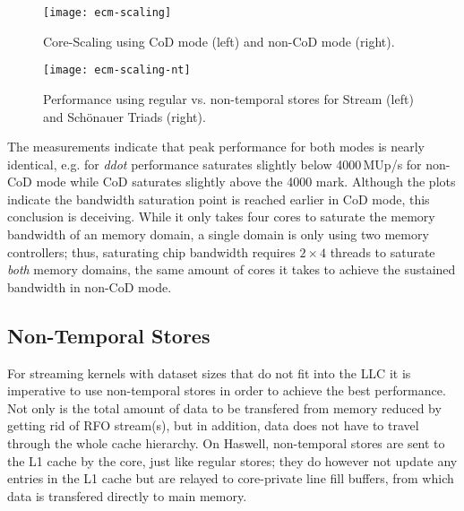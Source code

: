 \documentclass{llncs}
\begin{document}
\begin{figure}[tb]
\begin{minipage}{.49\textwidth}
    \vspace{-\baselineskip}
    \centering
    \texttt{[image: ecm-scaling]}
    \caption{Core-Scaling using \ac{CoD} mode (left) and non-\ac{CoD} mode (right).}
    \label{fig:ecm-scaling}
\end{minipage}\hfill
\begin{minipage}{.49\textwidth}
    \centering
    \texttt{[image: ecm-scaling-nt]}
    \caption{Performance using regular vs. non-temporal stores for Stream (left)
    and Sch\"onauer Triads (right).}
    \label{fig:ecm-scaling-nt}
\end{minipage}
\end{figure}

The measurements indicate that peak performance for both modes is nearly
identical, e.g. for \textit{ddot} performance saturates slightly below
4000\,MUp/s for non-\ac{CoD} mode while \ac{CoD} saturates slightly above the
4000 mark.  Although the plots indicate the bandwidth saturation point is
reached earlier in \ac{CoD} mode, this conclusion is deceiving. While it only
takes four cores to saturate the memory bandwidth of an memory domain, a single
domain is only using two memory controllers; thus, saturating chip bandwidth
requires $2\times4$ threads to saturate \textit{both} memory domains, the same
amount of cores it takes to achieve the sustained bandwidth in non-\ac{CoD}
mode.

\subsection{Non-Temporal Stores}

For streaming kernels with dataset sizes that do not fit into the \ac{LLC} it
is imperative to use non-temporal stores in order to achieve the best
performance.  Not only is the total amount of data to be transfered from memory
reduced by getting rid of \ac{RFO} stream(s), but in addition, data does not
have to travel through the whole cache hierarchy. On Haswell, non-temporal
stores are sent to the L1 cache by the core, just like regular stores; they do
however not update any entries in the L1 cache but are relayed to core-private
line fill buffers, from which data is transfered directly to main memory.
\end{document}
